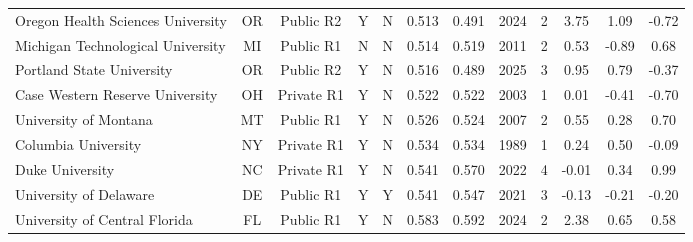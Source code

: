 \begin{longtable}{@{}p{3.55cm}ccccccccccc@{}}
Oregon Health Sciences University & OR & Public R2 & Y & N & 0.513 & 0.491 & 2024 & 2 & 3.75 & 1.09 & -0.72 \\
Michigan Technological University & MI & Public R1 & N & N & 0.514 & 0.519 & 2011 & 2 & 0.53 & -0.89 & 0.68 \\
Portland State University & OR & Public R2 & Y & N & 0.516 & 0.489 & 2025 & 3 & 0.95 & 0.79 & -0.37 \\
Case Western Reserve University & OH & Private R1 & Y & N & 0.522 & 0.522 & 2003 & 1 & 0.01 & -0.41 & -0.70 \\
University of Montana & MT & Public R1 & Y & N & 0.526 & 0.524 & 2007 & 2 & 0.55 & 0.28 & 0.70 \\
Columbia University & NY & Private R1 & Y & N & 0.534 & 0.534 & 1989 & 1 & 0.24 & 0.50 & -0.09 \\
Duke University & NC & Private R1 & Y & N & 0.541 & 0.570 & 2022 & 4 & -0.01 & 0.34 & 0.99 \\
University of Delaware & DE & Public R1 & Y & Y & 0.541 & 0.547 & 2021 & 3 & -0.13 & -0.21 & -0.20 \\
University of Central Florida & FL & Public R1 & Y & N & 0.583 & 0.592 & 2024 & 2 & 2.38 & 0.65 & 0.58 \\
\end{longtable}
